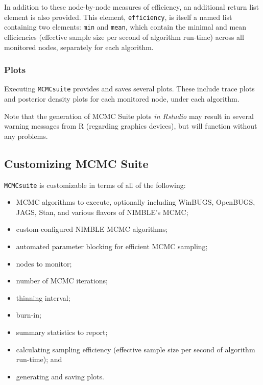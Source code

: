 \documentclass[12pt,oneside]{book}\usepackage[]{graphicx}\usepackage[]{color}
\def\cd#1{\texttt{#1}}
\begin{document}
In addition to these node-by-node measures of efficiency, an additional return list element is also provided.  This element, \cd{efficiency}, is itself a named list containing two elements: \cd{min} and \cd{mean}, which contain the minimal and mean efficiencies (effective sample size per second of algorithm run-time) across all monitored nodes, separately for each algorithm.

\subsubsection{Plots}

Executing \cd{MCMCsuite} provides and saves several plots.  These include trace plots and posterior density plots for each monitored node, under each algorithm.

Note that the generation of MCMC Suite plots \emph{in Rstudio} may result in several warning messages from R (regarding graphics devices), but will function without any problems.

\subsection{Customizing MCMC Suite}


\cd{MCMCsuite} is customizable in terms of all of the following: \\

\begin{itemize}
\item MCMC algorithms to execute, optionally including WinBUGS, OpenBUGS, JAGS, Stan, and various flavors of NIMBLE's MCMC;
\item custom-configured NIMBLE MCMC algorithms;
\item automated parameter blocking for efficient MCMC sampling;
\item nodes to monitor;
\item number of MCMC iterations;
\item thinning interval;
\item burn-in;
\item summary statistics to report;
\item calculating sampling efficiency (effective sample size per second of algorithm run-time); and 
\item generating and saving plots.
\end{itemize}
\ \\  %
\end{document}
